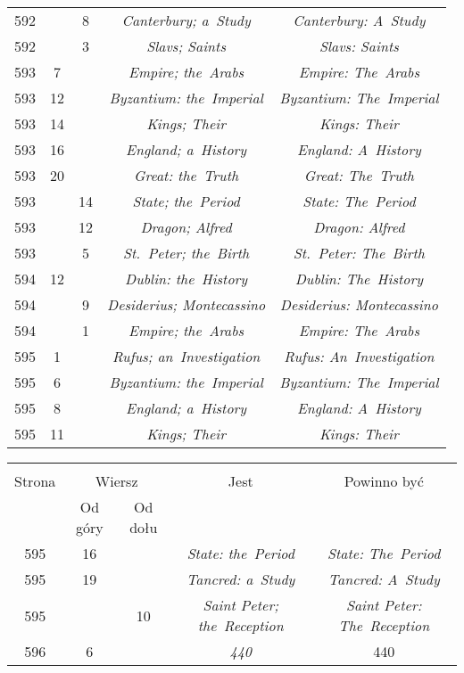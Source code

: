 \documentclass[a4paper,11pt]{article}  %
\begin{document}
\begin{center}
\begin{tabular}{|c|c|c|c|c|}
    592 & &  8 & \emph{Canterbury; a~Study} & \emph{Canterbury: A~Study} \\
    592 & &  3 & \emph{Slavs; Saints} & \emph{Slavs: Saints} \\
    593 &  7 & & \emph{Empire; the~Arabs} & \emph{Empire: The~Arabs} \\
    593 & 12 & & \emph{Byzantium: the~Imperial}
           & \emph{Byzantium: The~Imperial} \\
    593 & 14 & & \emph{Kings; Their} & \emph{Kings: Their} \\
    593 & 16 & & \emph{England; a~History} & \emph{England: A~History} \\
    593 & 20 & & \emph{Great: the~Truth} & \emph{Great: The~Truth} \\
    593 & & 14 & \emph{State; the~Period} & \emph{State: The~Period} \\
    593 & & 12 & \emph{Dragon; Alfred} & \emph{Dragon: Alfred} \\
    593 & &  5 & \emph{St.~Peter; the~Birth}
           & \emph{St.~Peter: The~Birth} \\
    594 & 12 & & \emph{Dublin: the~History} & \emph{Dublin: The~History} \\
    594 & &  9 & \emph{Desiderius; Montecassino}
           & \emph{Desiderius: Montecassino} \\
    594 & &  1 & \emph{Empire; the~Arabs} & \emph{Empire: The~Arabs} \\
    595 &  1 & & \emph{Rufus; an~Investigation}
           & \emph{Rufus: An~Investigation} \\
    595 &  6 & & \emph{Byzantium: the~Imperial}
           & \emph{Byzantium: The~Imperial} \\
    595 &  8 & & \emph{England; a~History} & \emph{England: A~History} \\
    595 & 11 & & \emph{Kings; Their} & \emph{Kings: Their} \\
    \hline
  \end{tabular}

  \begin{tabular}{|c|c|c|c|c|}
    \hline
    & \multicolumn{2}{c|}{} & & \\
    Strona & \multicolumn{2}{c|}{Wiersz}& Jest & Powinno być \\ \cline{2-3}
    & Od góry & Od dołu &  &  \\ \hline
    595 & 16 & & \emph{State: the~Period} & \emph{State: The~Period} \\
    595 & 19 & & \emph{Tancred: a~Study} & \emph{Tancred: A~Study} \\
    595 & & 10 & \emph{Saint Peter; the~Reception}
           & \emph{Saint Peter: The~Reception} \\
    596 &  6 & & \emph{440} & 440 \\
    \hline
  \end{tabular}
\end{center}
\end{document}
